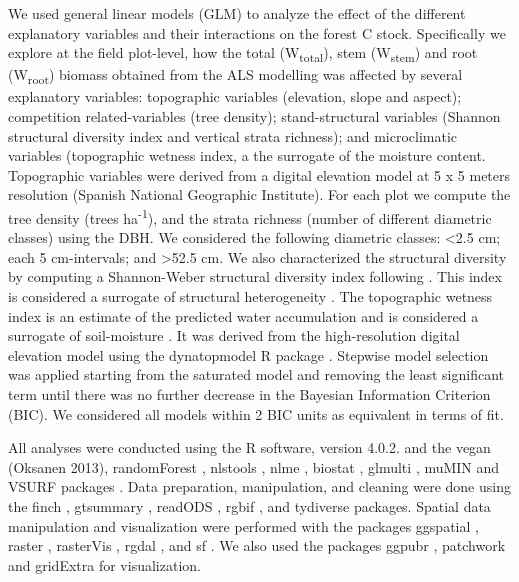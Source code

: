 We used general linear models (GLM) to analyze the effect of the different explanatory variables and their interactions on the forest C stock. Specifically we explore at the field plot-level, how the total (W\textsubscript{total}), stem (W\textsubscript{stem}) and root (W\textsubscript{root}) biomass obtained from the ALS modelling was affected by several explanatory variables: topographic variables (elevation, slope and aspect); competition related-variables (tree density); stand-structural variables (Shannon structural diversity index and vertical strata richness); and microclimatic variables (topographic wetness index, a the surrogate of the moisture content. Topographic variables were derived from a digital elevation model at 5 x 5 meters resolution (Spanish National Geographic Institute). For each plot we compute the tree density (trees ha\textsuperscript{-1}), and the strata richness (number of different diametric classes) using the DBH. We considered the following diametric classes: \textless2.5 cm; each 5 cm-intervals; and \textgreater52.5 cm. We also characterized the structural diversity by computing a Shannon-Weber structural diversity index following \autocite{delRioetal2003IndicesStand}. This index is considered a surrogate of structural heterogeneity \autocite{McElhinnyetal2005ForestWoodland,Gadowetal2012ForestStructure}. The topographic wetness index is an estimate of the predicted water accumulation and is considered a surrogate of soil-moisture \autocites[\emph{e.g.}][]{Zinkoetal2005PlantSpecies,Petrosellietal2013EcologicalBehavior}. It was derived from the high-resolution digital elevation model using the dynatopmodel R package \autocite{Metcalfeetal2018DynatopmodelImplementation}. Stepwise model selection was applied starting from the saturated model and removing the least significant term until there was no further decrease in the Bayesian Information Criterion (BIC). We considered all models within 2 BIC units as equivalent in terms of fit.

All analyses were conducted using the R software, version 4.0.2. \autocite{base} and the vegan (Oksanen 2013), randomForest \autocite{LiawWiener2002ClassificationRegression}, nlstools \autocite{nlstools}, nlme \autocite{Pinheiroetal2020NlmeLinear}, biostat \autocite{biostat}, glmulti \autocite{Calcagno2020GlmultiModel}, muMIN \autocite{Barton2020MuMInMultimodel} and VSURF packages \autocite{Genueretal2019VSURFVariable}. Data preparation, manipulation, and cleaning were done using the finch \autocite{finch}, gtsummary \autocite{gtsummary}, readODS \autocite{readODS}, rgbif \autocite{rgbif}, and tydiverse \autocite{tidyverse} packages. Spatial data manipulation and visualization were performed with the packages ggspatial \autocite{ggspatial}, raster \autocite{raster}, rasterVis \autocite{rasterVis}, rgdal \autocite{rgdal}, and sf \autocite{sf}. We also used the packages ggpubr \autocite{ggpubr}, patchwork \autocite{Pedersen2020PatchworkComposer} and gridExtra \autocite{gridExtra} for visualization.

